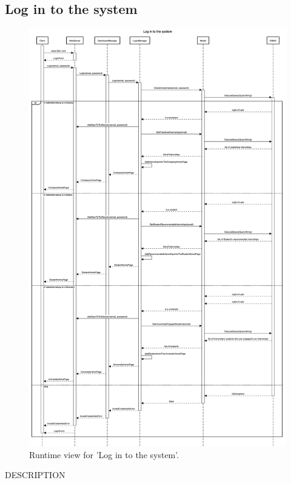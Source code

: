 \subsection{Log in to the system}
\begin{figure}[H]
    \begin{center}
        \includegraphics[width=0.8\linewidth]{DD/LaTeX/Images/RuntimeView/LogIn.png}
        \caption{Runtime view for 'Log in to the system'.}
        \label{fig:runtime_LogIn}%
    \end{center}
\end{figure}

DESCRIPTION


